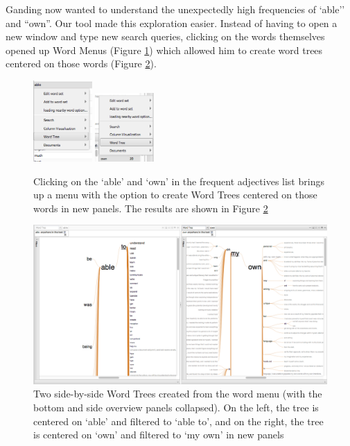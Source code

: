 \documentclass{sig-alternate}
\begin{document}
Ganding now wanted to understand the unexpectedly high frequencies of `able'' and ``own''. Our tool made this exploration easier. Instead of having to open a new window and type new search queries, clicking on the words themselves opened up Word Menus (Figure \ref{fig:rex03}) which allowed him to create word trees centered on those words (Figure \ref{fig:rex04}).   
\begin{figure}[h!]
\includegraphics[width=0.2\textwidth]{fig/rex/03.png}
\includegraphics[width=0.2\textwidth]{fig/rex/03b.png}
\caption{Clicking on the `able' and `own' in the frequent adjectives list brings up a menu with the option to create Word Trees centered on those words in new panels. The results are shown in Figure \ref{fig:rex04} \label{fig:rex03}}
\end{figure}

\begin{figure}[h!]
\includegraphics[width=\textwidth]{fig/rex/04.png}
\caption{ Two side-by-side Word Trees created from the word menu (with the bottom and side overview panels collapsed). On the left, the tree is centered on `able' and filtered to `able to', and on the right, the tree is centered on  `own' and filtered to `my own' in new panels \label{fig:rex04}}
\end{figure}
\end{document}
